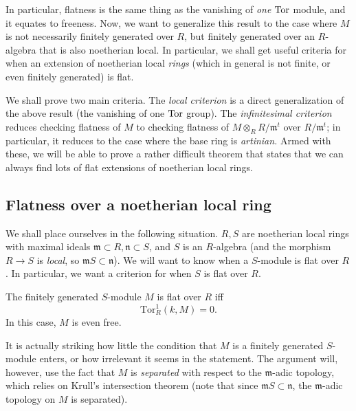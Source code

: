 In particular, flatness is the same thing as the vanishing of \emph{one}
$\operatorname{Tor}$ module, and it equates to freeness. Now, we want to generalize this
result to the case where $M$ is not necessarily finitely generated over $R$,
but finitely generated over an $R$-algebra that is also noetherian local. In
particular, we shall get useful criteria for when an extension of
noetherian local \emph{rings}
(which in general is not finite, or even finitely generated)
is flat.

We shall prove two main criteria. The \emph{local criterion} is a direct
generalization of the above result (the vanishing of one $\operatorname{Tor}$ group). The
\emph{infinitesimal criterion} reduces checking flatness of $M$ to checking
flatness of $M \otimes_R R/\mathfrak{m}^t$ over $R/\mathfrak{m}^t$; in
particular, it reduces to the case where the base ring is \emph{artinian.}
Armed with these, we will be able to prove a rather difficult theorem that
states that we can always find lots of flat extensions of noetherian local
rings. 

\subsection{Flatness over a noetherian local ring}

We shall place ourselves in the following situation. $R, S$ are noetherian
local rings with maximal ideals $\mathfrak{m} \subset R, \mathfrak{n} \subset
S$, and $S$ is an $R$-algebra (and the morphism $R \to S$ is \emph{local}, so
$\mathfrak{m}S \subset \mathfrak{n}$).
We will want to know when a $S$-module is flat over $R$. In particular, we
want a criterion for when $S$ is flat over $R$.

\begin{theorem} \label{localcrit} The finitely generated $S$-module $M$ is flat over $R$ iff
\[ \mathrm{Tor} ^1_R( k, M) = 0.\]
In this case, $M$ is even free.
\end{theorem}

It is actually striking how little the condition that $M$ is a finitely
generated $S$-module enters, or how irrelevant it seems in the statement. The
argument will, however, use the fact that $M$ is \emph{separated} with respect
to the $\mathfrak{m}$-adic topology, which relies on Krull's intersection
theorem (note that since $\mathfrak{m} S \subset \mathfrak{n}$, the
$\mathfrak{m}$-adic topology on $M$ is separated).

